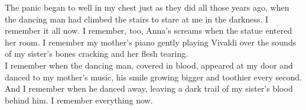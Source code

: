 \documentclass[a5paper]{scrartcl}
\begin{document}
The panic began to well in my chest just as they did all those years ago, when the dancing man had climbed the stairs to stare at me in the darkness.  I remember it all now. I remember, too, Anna's screams when the statue entered her room. I remember my mother's piano gently playing Vivaldi over the sounds of my sister's bones cracking and her flesh tearing. \\


I remember when the dancing man, covered in blood, appeared at my door and danced to my mother's music, his smile growing bigger and toothier every second. And I remember when he danced away, leaving a dark trail of my sister's blood behind him. I remember everything now.  \\
\end{document}
